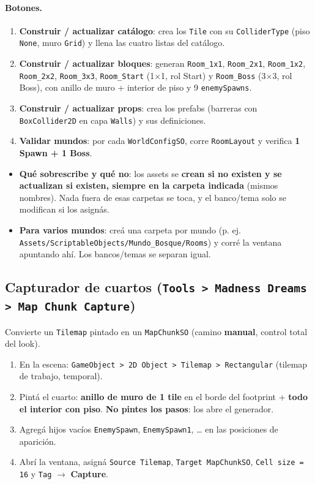 \documentclass[11pt,a4paper]{article}
\newcommand{\code}[1]{\texttt{#1}}
\begin{document}
\paragraph{Botones.}
\begin{enumerate}[leftmargin=1.4em]
  \item \textbf{Construir / actualizar catálogo}: crea los \code{Tile} con su \code{ColliderType}
        (piso \code{None}, muro \code{Grid}) y llena las cuatro listas del catálogo.
  \item \textbf{Construir / actualizar bloques}: generan \code{Room\_1x1}, \code{Room\_2x1}, \code{Room\_1x2},
        \code{Room\_2x2}, \code{Room\_3x3}, \code{Room\_Start} (1$\times$1, rol Start) y \code{Room\_Boss} (3$\times$3, rol Boss),
        con anillo de muro + interior de piso y 9 \code{enemySpawns}.
  \item \textbf{Construir / actualizar props}: crea los prefabs (barreras con \code{BoxCollider2D} en capa \code{Walls}) y sus definiciones.
  \item \textbf{Validar mundos}: por cada \code{WorldConfigSO}, corre \code{RoomLayout} y verifica \textbf{1 Spawn + 1 Boss}.
\end{enumerate}

\begin{itemize}[leftmargin=1.4em]
  \item \textbf{Qué sobrescribe y qué no}: los assets se \textbf{crean si no existen y se actualizan si existen,
        siempre en la carpeta indicada} (mismos nombres). Nada fuera de esas carpetas se toca, y el banco/tema
        solo se modifican si los asignás.
  \item \textbf{Para varios mundos}: creá una carpeta por mundo (p. ej. \code{Assets/ScriptableObjects/Mundo\_Bosque/Rooms})
        y corré la ventana apuntando ahí. Los bancos/temas se separan igual.
\end{itemize}

\subsection{Capturador de cuartos (\code{Tools > Madness Dreams > Map Chunk Capture})}

Convierte un \code{Tilemap} pintado en un \code{MapChunkSO} (camino \textbf{manual}, control total del look).

\begin{enumerate}[leftmargin=1.4em]
  \item En la escena: \code{GameObject > 2D Object > Tilemap > Rectangular} (tilemap de trabajo, temporal).
  \item Pintá el cuarto: \textbf{anillo de muro de 1 tile} en el borde del footprint + \textbf{todo el interior con piso}.
        \textbf{No pintes los pasos}: los abre el generador.
  \item Agregá hijos vacíos \code{EnemySpawn}, \code{EnemySpawn1}, \ldots{} en las posiciones de aparición.
  \item Abrí la ventana, asigná \code{Source Tilemap}, \code{Target MapChunkSO}, \code{Cell size = 16} y \code{Tag} $\rightarrow$ \textbf{Capture}.
\end{enumerate}
\end{document}
